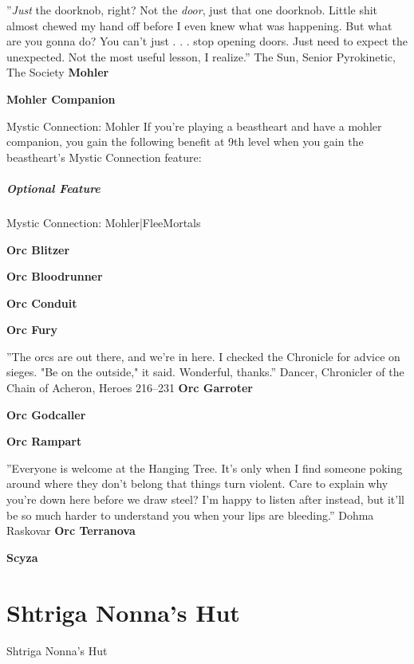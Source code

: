 \documentclass[10pt,a4paper,twoside,bg=print,twocolumn,openany,nodeprecatedcode]{dndbook}
\begin{document}
\DndQuote%
{}
{''\textit{Just} the doorknob, right? Not the \textit{door}, just that one doorknob. Little shit almost chewed my hand off before I even knew what was happening. But what are you gonna do? You can't just . . . stop opening doors. Just need to expect the unexpected. Not the most useful lesson, I realize.''}
{The Sun, Senior Pyrokinetic, The Society}
\textbf{Mohler}

\textbf{Mohler Companion}

\begin{DndSidebar}[float=!b]{Mystic Connection: Mohler}
If you're playing a beastheart and have a mohler companion, you gain the following benefit at 9th level when you gain the beastheart's Mystic Connection feature:



\paragraph{Optional Feature}
Mystic Connection: Mohler|FleeMortals



\end{DndSidebar}

\textbf{Orc Blitzer}

\textbf{Orc Bloodrunner}

\textbf{Orc Conduit}

\textbf{Orc Fury}

\DndQuote%
{}
{''The orcs are out there, and we're in here. I checked the Chronicle for advice on sieges. "Be on the outside," it said. Wonderful, thanks.''}
{Dancer, Chronicler of the Chain of Acheron, Heroes 216–231}
\textbf{Orc Garroter}

\textbf{Orc Godcaller}

\textbf{Orc Rampart}

\DndQuote%
{}
{''Everyone is welcome at the Hanging Tree. It's only when I find someone poking around where they don't belong that things turn violent. Care to explain why you're down here before we draw steel? I'm happy to listen after instead, but it'll be so much harder to understand you when your lips are bleeding.''}
{Dohma Raskovar}
\textbf{Orc Terranova}

\textbf{Scyza}

\chapter{Shtriga Nonna's Hut}
Shtriga Nonna's Hut
\end{document}
